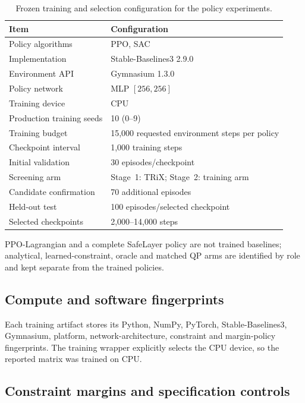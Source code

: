 \documentclass[10pt]{article}
\begin{document}
\begin{table}[htbp]
\centering
\caption{Frozen training and selection configuration for the policy experiments.}
\label{tab:submitted-10}
\begin{tabular}{ll}
\toprule
Item & Configuration\\
\midrule
Policy algorithms & PPO, SAC\\
Implementation & Stable-Baselines3 2.9.0\\
Environment API & Gymnasium 1.3.0\\
Policy network & MLP $[256,256]$\\
Training device & CPU\\
Production training seeds & 10 (0--9)\\
Training budget & 15,000 requested environment steps per policy\\
Checkpoint interval & 1,000 training steps\\
Initial validation & 30 episodes/checkpoint\\
Screening arm & Stage~1: TRiX; Stage~2: training arm\\
Candidate confirmation & 70 additional episodes\\
Held-out test & 100 episodes/selected checkpoint\\
Selected checkpoints & 2,000--14,000 steps\\
\bottomrule
\end{tabular}
\end{table}

PPO-Lagrangian and a complete SafeLayer policy are not trained baselines;
analytical, learned-constraint, oracle and matched QP arms are identified by
role and kept separate from the trained policies.


\subsection{Compute and software fingerprints}

Each training artifact stores its Python, NumPy, PyTorch, Stable-Baselines3,
Gymnasium, platform, network-architecture, constraint and margin-policy
fingerprints. The training wrapper explicitly selects the CPU device, so the reported matrix was trained on CPU.


\subsection{Constraint margins and specification controls}
\end{document}
